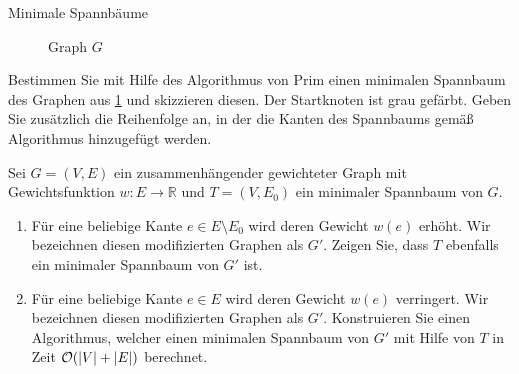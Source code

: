 \documentclass{article}
\begin{document}
\begin{eexercises}{Minimale Spannbäume}
{\begin{figure}[ht]
      \caption{Graph $G$}\label{fig:mstgraph}
    \end{figure}
  }
  \item Bestimmen Sie mit Hilfe des Algorithmus von Prim einen minimalen Spannbaum des Graphen aus \ref{fig:mstgraph} und skizzieren diesen. Der Startknoten ist grau gefärbt. Geben Sie zusätzlich die Reihenfolge an, in der die Kanten des Spannbaums gemäß Algorithmus hinzugefügt werden.
  \item Sei $G = (V, E)$ ein zusammenhängender gewichteter Graph mit Gewichtsfunktion $w : E \rightarrow \mathbb{R}$ und $T = (V, E_0)$ ein minimaler Spannbaum von $G$.
  \begin{enumerate}
    \item Für eine beliebige Kante $e \in E \setminus E_0$ wird deren Gewicht $w(e)$ erhöht. Wir bezeichnen diesen modifizierten Graphen als $G'$. Zeigen Sie, dass $T$ ebenfalls ein minimaler Spannbaum von $G'$ ist.
    \item Für eine beliebige Kante $e \in E$ wird deren Gewicht $w(e)$ verringert. Wir bezeichnen diesen modifizierten Graphen als $G'$. Konstruieren Sie einen Algorithmus, welcher einen minimalen Spannbaum von $G'$ mit Hilfe von $T$ in Zeit $\mathcal{O}(|V| + |E|)$ berechnet.
  \end{enumerate}
\end{eexercises}
\end{document}
